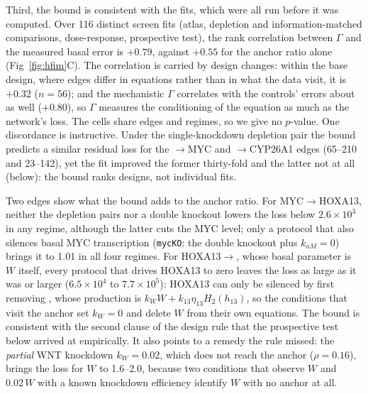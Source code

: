 Third, the bound is consistent with the fits, which were all run before it was
computed. Over 116 distinct screen fits (atlas, depletion and
information-matched comparisons, dose-response, prospective test), the rank
correlation between $\Gamma$ and the measured basal error is $+0.79$, against $+0.55$
for the anchor ratio alone (Fig~\ref{fig:hfim}C). The correlation is carried by
design changes: within the base design, where edges differ in equations rather
than in what the data visit, it is $+0.32$ ($n=56$); and the mechanistic $\Gamma$
correlates with the controls' errors about as well ($+0.80$), so $\Gamma$ measures
the conditioning of the equation as much as the network's loss. The cells share
edges and regimes, so we give no $p$-value. One discordance is instructive.
Under the single-knockdown depletion pair the bound predicts a similar
residual loss for the \bcat{}$\to$MYC and \bcat{}$\to$CYP26A1 edges (65--210 and
23--142), yet the fit improved the former thirty-fold and the latter not at all
(below): the bound ranks designs, not individual fits.

Two edges show what the bound adds to the anchor ratio. For MYC$\to$HOXA13,
neither the depletion pairs nor a \bcat{} double knockout lowers the loss below
$2.6\times10^3$ in any regime, although the latter cuts the MYC level; only a
protocol that also silences basal MYC transcription (\texttt{mycKO}: the
\bcat{} double knockout plus $k_{aM}=0$) brings it to 1.01 in all four regimes.
For HOXA13$\to$\bcat{}, whose basal parameter is $W$ itself, every protocol
that drives HOXA13 to zero leaves the loss as large as it was or larger
($6.5\times10^4$ to $7.7\times10^5$): HOXA13 can only be silenced by first removing \bcat{}, whose
production is $k_WW+k_{13}\eta_{13}H_2(h_{13})$, so the conditions that visit
the anchor set $k_W=0$ and delete $W$ from their own equations. The bound is
consistent with the second clause of the design rule that the prospective test
below arrived at empirically. It also points to a remedy the rule missed: the
\emph{partial} WNT knockdown $k_W=0.02$, which does not reach the anchor
($\rho=0.16$), brings the loss for $W$ to 1.6--2.0, because two conditions that
observe $W$ and $0.02\,W$ with a known knockdown efficiency identify $W$ with no
anchor at all.

